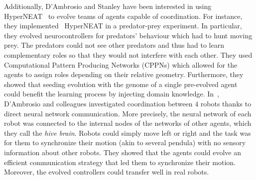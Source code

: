     Additionally, D'Ambrosio and Stanley have been interested in using HyperNEAT~\parencite{Stanley2009a} to evolve teams of agents capable of coordination. For instance, they implemented~\parencite{DAmbrosio2008} HyperNEAT in a predator-prey experiment. In particular, they evolved neurocontrollers for predators' behaviour which had to hunt moving prey. The predators could not see other predators and thus had to learn complementary roles so that they would not interfere with each other. They used Computational Pattern Producing Networks (CPPNs) which allowed for the agents to assign roles depending on their relative geometry. Furthermore, they showed that seeding evolution with the genome of a single pre-evolved agent could benefit the learning process by injecting domain knowledge. In~\parencite{DAmbrosio2012}, D'Ambrosio and colleagues investigated coordination between $4$ robots thanks to direct neural network communication. More precisely, the neural network of each robot was connected to the internal nodes of the networks of other agents, which they call the \emph{hive brain}. Robots could simply move left or right and the task was for them to synchronize their motion (akin to several pendula) with no sensory information about other robots. They showed that the agents could evolve an efficient communication strategy that led them to synchronize their motion. Moreover, the evolved controllers could transfer well in real robots.


